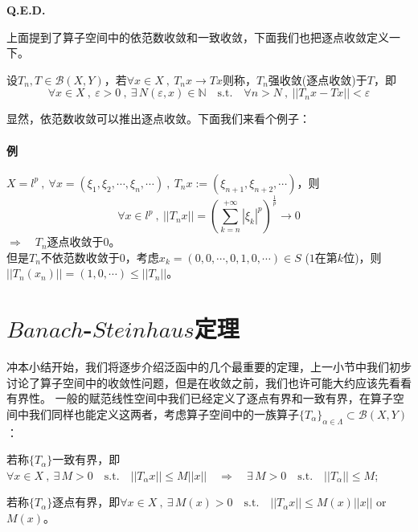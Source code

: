 \textbf{Q.E.D.}

上面提到了算子空间中的依范数收敛和一致收敛，下面我们也把逐点收敛定义一下。
\begin{definition}
    设$T_n,T \in \mathscr{B}(X,Y)$，若$\forall x \in X \ , \ T_nx \to Tx$则称，$T_n$强收敛(逐点收敛)于$T$，即
    \[\forall x \in X \ , \ \varepsilon>0 \ , \ \exists \, N(\varepsilon,x) \in \mathbb{N} \quad \text{s.t.} \quad \forall n>N \ , \ ||T_nx-Tx||<\varepsilon\]
\end{definition}
显然，依范数收敛可以推出逐点收敛。下面我们来看个例子：
\paragraph*{例} \quad $X=l^p \ , \ \forall x=(\xi_1,\xi_2,\cdots,\xi_n,\cdots) \ , \ T_nx:=(\xi_{n+1},\xi_{n+2},\cdots)$，则
\[\forall x \in l^p \ , \ ||T_nx||=\left(\sum_{k=n}^{+\infty}|\xi_k|^p\right)^{\frac{1}{p}} \to 0\]
$\Rightarrow \quad T_n$逐点收敛于$0$。\\
但是$T_n$不依范数收敛于$0$，考虑$x_k=(0,0,\cdots,0,1,0,\cdots) \in S$ ($1$在第$k$位)，则$||T_n(x_n)||=(1,0,\cdots) \leq ||T_n||$。

\section{$Banach$-$Steinhaus$定理}
冲本小结开始，我们将逐步介绍泛函中的几个最重要的定理，上一小节中我们初步讨论了算子空间中的收敛性问题，但是在收敛之前，我们也许可能大约应该先看看有界性。
一般的赋范线性空间中我们已经定义了逐点有界和一致有界，在算子空间中我们同样也能定义这两者，考虑算子空间中的一族算子$\{T_{\alpha}\}_{\alpha \in \Lambda} \subset \mathscr{B}(X,Y)$：

若称$\{T_{\alpha}\}$一致有界，即$\forall x \in X \ , \ \exists \, M>0 \quad \text{s.t.} \quad ||T_{\alpha}x|| \leq M||x|| \quad \Rightarrow \quad \exists \, M>0 \quad \text{s.t.} \quad ||T_{\alpha}|| \leq M$;

若称$\{T_{\alpha}\}$逐点有界，即$\forall x \in X \ , \ \exists \, M(x)>0 \quad \text{s.t.} \quad ||T_{\alpha}x|| \leq M(x)||x||$ or $M(x)$。

